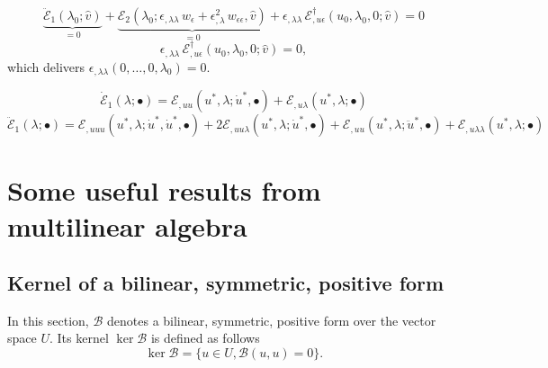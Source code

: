 \documentclass[12pt, final]{scrartcl}
\theoremstyle{definition}
\newcommand{\E}{\mathcal E}
\newcommand{\EE}{\mathcal E ^ \dagger}
\begin{document}
\begin{equation*}
  \underbrace{\ddot{\E}_1(\lambda_0; \hat{v})}_{=0}
  + \underbrace{\E_2(\lambda_0; \epsilon_{,\lambda\lambda} \, w_\epsilon + \epsilon_{,\lambda}^2 \, w_{\epsilon\epsilon}, \hat{v})}_{=0}
  + \epsilon_{,\lambda\lambda} \, \EE_{,u\epsilon}(u_0, \lambda_0, 0; \hat{v}) = 0
\end{equation*}
\begin{equation}
  \epsilon_{,\lambda\lambda} \, \EE_{,u\epsilon}(u_0, \lambda_0, 0; \hat{v}) = 0,
\end{equation}
which delivers \(\epsilon_{,\lambda\lambda}(0, \ldots, 0, \lambda_0) = 0\).

\begin{equation*}
  \dot{\E}_1(\lambda; \bullet) = \E_{,uu}(u^\ast, \lambda; \dot{u}^\ast, \bullet) + \E_{,u\lambda}(u^\ast, \lambda; \bullet)
\end{equation*}
\begin{equation*}
  \ddot{\E}_1(\lambda; \bullet) = \E_{,uuu}(u^\ast, \lambda; \dot{u}^\ast, \dot{u}^\ast, \bullet) + 2\E_{,uu\lambda}(u^\ast, \lambda; \dot{u}^\ast, \bullet) + \E_{,uu}(u^\ast, \lambda; \ddot{u}^\ast, \bullet) + \E_{,u\lambda\lambda}(u^\ast, \lambda; \bullet)
\end{equation*}

\appendix

\section{Some useful results from multilinear algebra}

\subsection{Kernel of a bilinear, symmetric, positive form}

In this section, $\mathcal{B}$ denotes a bilinear, symmetric, positive form over the vector space $U$. Its kernel
$\ker \mathcal{B}$ is defined as follows
\begin{equation}
 \ker \mathcal{B}= \bigl\{ u \in U, \mathcal{B}(u, u) = 0 \bigr\} .
\end{equation}
\end{document}
